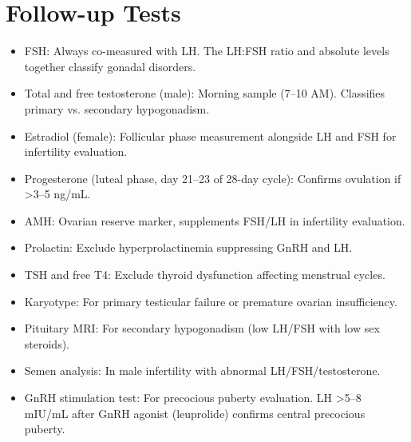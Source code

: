 \section*{Follow-up Tests}
\begin{itemize}
  \item FSH: Always co-measured with LH. The LH:FSH ratio and absolute levels together classify gonadal disorders.
  \item Total and free testosterone (male): Morning sample (7--10 AM). Classifies primary vs. secondary hypogonadism.
  \item Estradiol (female): Follicular phase measurement alongside LH and FSH for infertility evaluation.
  \item Progesterone (luteal phase, day 21--23 of 28-day cycle): Confirms ovulation if >3--5 ng/mL.
  \item AMH: Ovarian reserve marker, supplements FSH/LH in infertility evaluation.
  \item Prolactin: Exclude hyperprolactinemia suppressing GnRH and LH.
  \item TSH and free T4: Exclude thyroid dysfunction affecting menstrual cycles.
  \item Karyotype: For primary testicular failure or premature ovarian insufficiency.
  \item Pituitary MRI: For secondary hypogonadism (low LH/FSH with low sex steroids).
  \item Semen analysis: In male infertility with abnormal LH/FSH/testosterone.
  \item GnRH stimulation test: For precocious puberty evaluation. LH >5--8 mIU/mL after GnRH agonist (leuprolide) confirms central precocious puberty.
\end{itemize}

